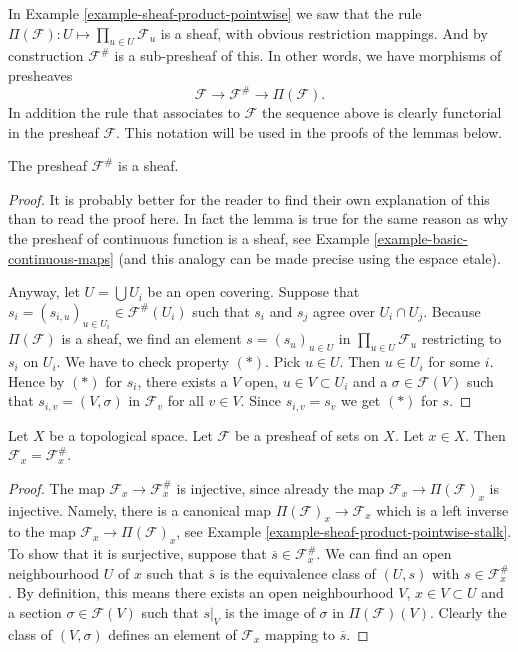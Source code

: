 \medskip\noindent
In Example \ref{example-sheaf-product-pointwise} we saw
that the rule $\Pi(\mathcal{F}) : U \mapsto \prod_{u\in U} \mathcal{F}_u$
is a sheaf, with obvious restriction mappings. And by construction
$\mathcal{F}^{\#}$ is a sub-presheaf of this. In other words, we
have morphisms of presheaves
$$
\mathcal{F} \to \mathcal{F}^\# \to \Pi(\mathcal{F}).
$$
In addition the rule that associates to $\mathcal{F}$
the sequence above is clearly functorial in the presheaf $\mathcal{F}$.
This notation will be
used in the proofs of the lemmas below.

\begin{lemma}
\label{lemma-sheafification-sheaf}
The presheaf $\mathcal{F}^{\#}$ is a sheaf.
\end{lemma}

\begin{proof}
It is probably better for the reader to find their own explanation
of this than to read the proof here. In fact the lemma is true
for the same reason as why the presheaf of continuous
function is a sheaf, see Example \ref{example-basic-continuous-maps}
(and this analogy can be made precise using the espace etale).

\medskip\noindent
Anyway, let $U = \bigcup U_i$ be an open covering.
Suppose that $s_i = (s_{i,u})_{u \in U_i} \in \mathcal{F}^{\#}(U_i)$
such that $s_i$ and $s_j$ agree over $U_i \cap U_j$.
Because $\Pi(\mathcal{F})$ is a sheaf,
we find an element $s = (s_u)_{u\in U}$ in $\prod_{u\in U} \mathcal{F}_u$
restricting to $s_i$ on $U_i$. We have to check property $(*)$.
Pick $u \in U$. Then $u \in U_i$ for some $i$. Hence by $(*)$ for $s_i$,
there exists a $V$ open, $u \in V \subset U_i$
and a $\sigma \in \mathcal{F}(V)$
such that $s_{i, v} = (V, \sigma)$ in $\mathcal{F}_v$ 
for all $v \in V$. Since $s_{i,v} = s_v$ we get $(*)$ for $s$.
\end{proof}

\begin{lemma}
\label{lemma-stalk-sheafification}
Let $X$ be a topological space.
Let $\mathcal{F}$ be a presheaf of sets on $X$.
Let $x \in X$. Then $\mathcal{F}_x = \mathcal{F}^\#_x$.
\end{lemma}

\begin{proof}
The map $\mathcal{F}_x \to \mathcal{F}^\#_x$
is injective, since already the map
$\mathcal{F}_x \to \Pi(\mathcal{F})_x$ is injective.
Namely, there is a canonical map $\Pi(\mathcal{F})_x \to \mathcal{F}_x$
which is a left inverse to the map $\mathcal{F}_x \to \Pi(\mathcal{F})_x$,
see Example \ref{example-sheaf-product-pointwise-stalk}.
To show that it is surjective, suppose that
$\overline{s} \in \mathcal{F}^\#_x$.
We can find an open neighbourhood $U$ of $x$ such that
$\overline{s}$ is the equivalence class of $(U, s)$
with $s \in \mathcal{F}^\#_x$.
By definition, this means there exists an open neighbourhood
$V$, $x \in V \subset U$ and a section $\sigma \in \mathcal{F}(V)$
such that $s|_V$ is the image of $\sigma$ in $\Pi(\mathcal{F})(V)$.
Clearly the class of $(V, \sigma)$ defines an element of
$\mathcal{F}_x$ mapping to $\overline{s}$.
\end{proof}

